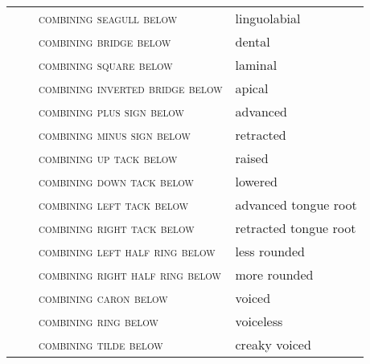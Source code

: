 \label{tab:ipa_diacritics}
 \tablelasttail{\bottomrule}

\begin{center}
\begin{xtabular}{ l L{1.2cm} L{6.6cm} L{3cm} }
 &  & \textsc{combining seagull below} & linguolabial \\
 &  & \textsc{combining bridge below} & dental \\
 &  & \textsc{combining square below} & laminal \\
 &  & \textsc{combining inverted bridge below} & apical \\
 &  & \textsc{combining plus sign below} & advanced \\
 &  & \textsc{combining minus sign below} & retracted \\
 &  & \textsc{combining up tack below} & raised \\
 &  & \textsc{combining down tack below} & lowered \\
 &  & \textsc{combining left tack below} & advanced tongue root \\
 &  & \textsc{combining right tack below} & retracted tongue root \\
 &  & \textsc{combining left half ring below} & less rounded \\
 &  & \textsc{combining right half ring below} & more rounded \\
 &  & \textsc{combining caron below} & voiced \\
 &  & \textsc{combining ring below} & voiceless \\
 &  & \textsc{combining tilde below} & creaky voiced \\

\end{xtabular}
\end{center}
